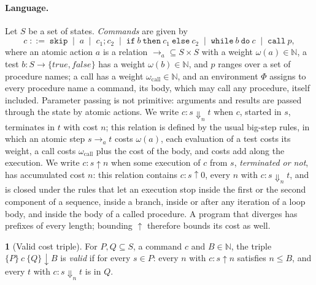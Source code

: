 \documentclass[oneside,english]{amsart}
\numberwithin{equation}{section}
\numberwithin{figure}{section}
\theoremstyle{plain}
\theoremstyle{definition}
\newtheorem{defn}[thm]{\protect\definitionname}
\theoremstyle{plain}
\theoremstyle{remark}
\theoremstyle{plain}
\theoremstyle{definition}
\theoremstyle{plain}
\theoremstyle{remark}
\providecommand{\definitionname}{Definition}
\begin{document}
\paragraph{Language.}
Let $S$ be a set of states. \emph{Commands} are given by
\[
c \;::=\; \mathtt{skip} \;\mid\; a \;\mid\; c_1 ; c_2 \;\mid\; \mathtt{if}\ b\ \mathtt{then}\ c_1\ \mathtt{else}\ c_2 \;\mid\; \mathtt{while}\ b\ \mathtt{do}\ c \;\mid\; \mathtt{call}\ p,
\]
where an atomic action $a$ is a relation ${\to_a} \subseteq S \times S$ with a weight $\omega(a) \in \mathbb{N}$, a test $b : S \to \{\mathit{true}, \mathit{false}\}$ has a weight $\omega(b) \in \mathbb{N}$, and $p$ ranges over a set of procedure names; a call has a weight $\omega_{\mathrm{call}} \in \mathbb{N}$, and an environment $\Phi$ assigns to every procedure name a command, its body, which may call any procedure, itself included. Parameter passing is not primitive: arguments and results are passed through the state by atomic actions. We write $c : s \Downarrow_n t$ when $c$, started in $s$, terminates in $t$ with cost $n$; this relation is defined by the usual big-step rules, in which an atomic step $s \to_a t$ costs $\omega(a)$, each evaluation of a test costs its weight, a call costs $\omega_{\mathrm{call}}$ plus the cost of the body, and costs add along the execution. We write $c : s \uparrow n$ when some execution of $c$ from $s$, \emph{terminated or not}, has accumulated cost $n$: this relation contains $c : s \uparrow 0$, every $n$ with $c : s \Downarrow_n t$, and is closed under the rules that let an execution stop inside the first or the second component of a sequence, inside a branch, inside or after any iteration of a loop body, and inside the body of a called procedure. A program that diverges has prefixes of every length; bounding $\uparrow$ therefore bounds its cost as well.

\begin{defn}[Valid cost triple]
\label{def:valid-triple}
For $P, Q \subseteq S$, a command $c$ and $B \in \mathbb{N}$, the triple $\{P\}\ c\ \{Q\}\!\downarrow\! B$ is \emph{valid} if for every $s \in P$: every $n$ with $c : s \uparrow n$ satisfies $n \le B$, and every $t$ with $c : s \Downarrow_n t$ is in $Q$.
\end{defn}
\end{document}
